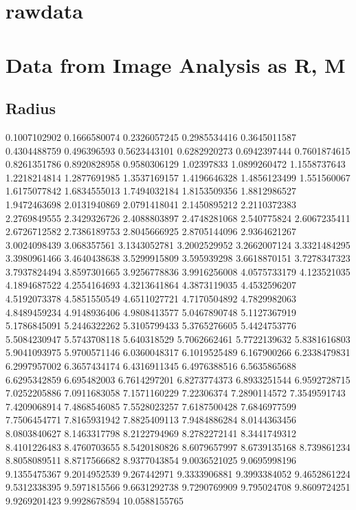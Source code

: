 \documentclass[draft=on]{scrbook}
\begin{document}
\section{rawdata}

\section{Data from Image Analysis as R, M}

\subsection*{Radius}
 0.1007102902
0.1666580074
0.2326057245
0.2985534416
0.3645011587
0.4304488759
0.496396593
0.5623443101
0.6282920273
0.6942397444
0.7601874615
0.8261351786
0.8920828958
0.9580306129
1.02397833
1.0899260472
1.1558737643
1.2218214814
1.2877691985
1.3537169157
1.4196646328
1.4856123499
1.551560067
1.6175077842
1.6834555013
1.7494032184
1.8153509356
1.8812986527
1.9472463698
2.0131940869
2.0791418041
2.1450895212
2.2110372383
2.2769849555
2.3429326726
2.4088803897
2.4748281068
2.540775824
2.6067235411
2.6726712582
2.7386189753
2.8045666925
2.8705144096
2.9364621267
3.0024098439
3.068357561
3.1343052781
3.2002529952
3.2662007124
3.3321484295
3.3980961466
3.4640438638
3.5299915809
3.595939298
3.6618870151
3.7278347323
3.7937824494
3.8597301665
3.9256778836
3.9916256008
4.0575733179
4.123521035
4.1894687522
4.2554164693
4.3213641864
4.3873119035
4.4532596207
4.5192073378
4.5851550549
4.6511027721
4.7170504892
4.7829982063
4.8489459234
4.9148936406
4.9808413577
5.0467890748
5.1127367919
5.1786845091
5.2446322262
5.3105799433
5.3765276605
5.4424753776
5.5084230947
5.5743708118
5.640318529
5.7062662461
5.7722139632
5.8381616803
5.9041093975
5.9700571146
6.0360048317
6.1019525489
6.167900266
6.2338479831
6.2997957002
6.3657434174
6.4316911345
6.4976388516
6.5635865688
6.6295342859
6.695482003
6.7614297201
6.8273774373
6.8933251544
6.9592728715
7.0252205886
7.0911683058
7.1571160229
7.22306374
7.2890114572
7.3549591743
7.4209068914
7.4868546085
7.5528023257
7.6187500428
7.6846977599
7.7506454771
7.8165931942
7.8825409113
7.9484886284
8.0144363456
8.0803840627
8.1463317798
8.2122794969
8.2782272141
8.3441749312
8.4101226483
8.4760703655
8.5420180826
8.6079657997
8.6739135168
8.739861234
8.8058089511
8.8717566682
8.9377043854
9.0036521025
9.0695998196
9.1355475367
9.2014952539
9.267442971
9.3333906881
9.3993384052
9.4652861224
9.5312338395
9.5971815566
9.6631292738
9.7290769909
9.795024708
9.8609724251
9.9269201423
9.9928678594
10.0588155765
\end{document}
